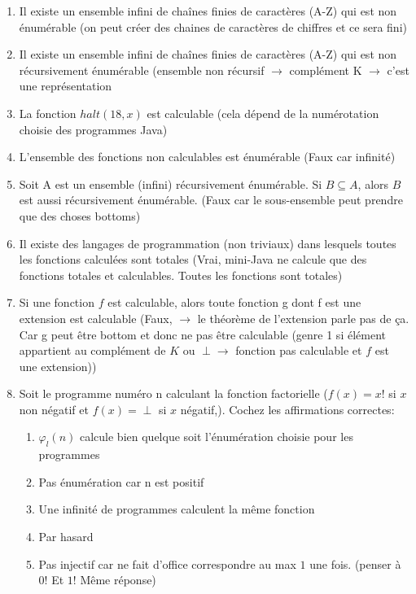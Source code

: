 \documentclass{report}
\begin{document}
\begin{enumerate}
\item Il existe un ensemble infini de chaînes finies de caractères (A-Z) qui est non énumérable (on peut créer des chaines de caractères de chiffres et ce sera fini)
\item Il existe un ensemble infini de chaînes finies de caractères (A-Z) qui est non récursivement énumérable (ensemble non récursif $\rightarrow$ complément K $\rightarrow$ c'est une représentation
\item La fonction $halt(18,x)$ est calculable (cela dépend de la numérotation choisie des programmes Java)
\item L'ensemble des fonctions non calculables est énumérable (Faux car infinité)
\item Soit A est un ensemble (infini) récursivement énumérable.  Si $ B \subseteq A $, alors $B$ est aussi récursivement énumérable. (Faux car le sous-ensemble peut prendre que des choses bottoms)
\item Il existe des langages de programmation (non triviaux) dans lesquels toutes les fonctions calculées sont totales (Vrai, mini-Java ne calcule que des fonctions totales et calculables. Toutes les fonctions sont totales)
\item Si une fonction $f$ est calculable, alors toute fonction g dont f est une extension est calculable (Faux, $\rightarrow$ le théorème de l'extension parle pas de ça. Car g peut être bottom et donc ne pas être calculable (genre 1 si élément appartient au complément de $K$ ou $\perp \rightarrow$ fonction pas calculable et $f$ est une extension))
\item Soit le programme numéro n calculant la fonction factorielle ($f(x)=x!$ si $x$ non négatif et $f(x)=\perp$ si $x$ négatif,).  Cochez les affirmations correctes:
	\begin{enumerate}
	\item $\varphi_l(n)$ calcule bien quelque soit l'énumération choisie pour les programmes
	\item Pas énumération car n est positif
	\item Une infinité de programmes calculent la même fonction
	\item Par hasard
	\item Pas injectif car ne fait d'office correspondre au max $1$ une fois. (penser à $0!$ Et $1!$ Même réponse)
		\end{enumerate}

\end{enumerate}
\end{document}
